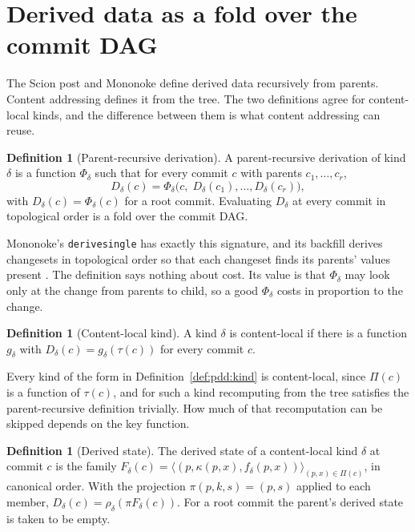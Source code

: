 \documentclass[11pt,letterpaper]{article}
\theoremstyle{definition}
\newtheorem{definition}[theorem]{Definition}
\theoremstyle{remark}
\newcommand{\tree}{\tau}
\DeclareRobustCommand{\code}[1]{{\def\_{\textunderscore\allowbreak}\texttt{#1}}}
\begin{document}
\section{Derived data as a fold over the commit DAG}
\label{sec:pdd:fold}

The Scion post and Mononoke define derived data recursively from parents. Content addressing defines it from the tree. The two definitions agree for content-local kinds, and the difference between them is what content addressing can reuse.

\begin{definition}[Parent-recursive derivation]
\label{def:pdd:fold}
A parent-recursive derivation of kind $\delta$ is a function $\Phi_\delta$ such that for every commit $c$ with parents $c_1,\ldots,c_r$,
\[
D_\delta(c)=\Phi_\delta\bigl(c,\;D_\delta(c_1),\ldots,D_\delta(c_r)\bigr),
\]
with $D_\delta(c)=\Phi_\delta(c)$ for a root commit. Evaluating $D_\delta$ at every commit in topological order is a fold over the commit DAG.
\end{definition}

Mononoke's \code{derive\_single} has exactly this signature, and its backfill derives changesets in topological order so that each changeset finds its parents' values present \cite{mononokederived}. The definition says nothing about cost. Its value is that $\Phi_\delta$ may look only at the change from parents to child, so a good $\Phi_\delta$ costs in proportion to the change.

\begin{definition}[Content-local kind]
\label{def:pdd:content-local}
A kind $\delta$ is content-local if there is a function $g_\delta$ with $D_\delta(c)=g_\delta(\tree(c))$ for every commit $c$.
\end{definition}

Every kind of the form in Definition~\ref{def:pdd:kind} is content-local, since $\Pi(c)$ is a function of $\tree(c)$, and for such a kind recomputing from the tree satisfies the parent-recursive definition trivially. How much of that recomputation can be skipped depends on the key function.

\begin{definition}[Derived state]
\label{def:pdd:state}
The derived state of a content-local kind $\delta$ at commit $c$ is the family $F_\delta(c)=\langle (p,\kappa(p,x),f_\delta(p,x))\rangle_{(p,x)\in\Pi(c)}$, in canonical order. With the projection $\pi(p,k,s)=(p,s)$ applied to each member, $D_\delta(c)=\rho_\delta(\pi F_\delta(c))$. For a root commit the parent's derived state is taken to be empty.
\end{definition}
\end{document}
